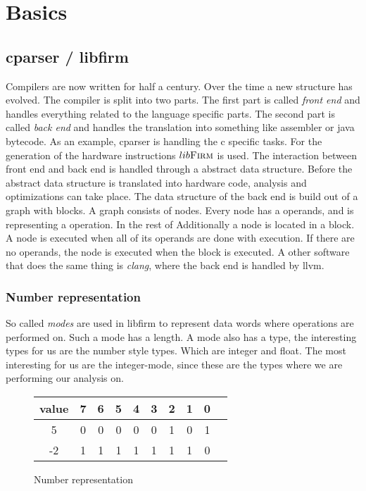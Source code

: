 \chapter{Basics}\label{sec:basics}

\section{cparser / libfirm}
Compilers are now written for half a century. Over the time a new structure has evolved. The compiler is split into two parts. The first part is called \textit{front end} and handles everything related to the language specific parts. The second part is called \textit{back end} and handles the translation into something like assembler or java bytecode. As an example, cparser is handling the c specific tasks. For the generation of the hardware instructions $lib\textsc{Firm}$ is used.
The interaction between front end and back end is handled through a abstract data structure.
Before the abstract data structure is translated into hardware code, analysis and optimizations can take place. 
The data structure of the back end is build out of a graph with blocks.
A graph consists of nodes. Every node has a operands, and is representing a operation. In the rest of  Additionally a node is located in a block. A node is executed when all of its operands are done with execution. If there are no operands, the node is executed when the block is executed.
A other software that does the same thing is \textit{clang}, where the back end is handled by llvm.


\subsection{Number representation}
So called \textit{modes} are used in libfirm to represent data words where operations are performed on. Such a mode has a length. A mode also has a type, the interesting types for us are the number style types. Which are integer and float. The most interesting for us are the integer-mode, since these are the types where we are performing our analysis on.

\begin{figure}
	\centering
	\begin{tabular}{c | c c c c c c c c c}
		value & 7 & 6 & 5 & 4 & 3 & 2 & 1 & 0 \\
		\hline
		5     & 0 & 0 & 0 & 0 & 0 & 1 & 0 & 1 \\
		-2    & 1 & 1 & 1 & 1 & 1 & 1 & 1 & 0 \\
	\end{tabular}
	\caption{Number representation}
	\label{fig:numbers}
\end{figure}

